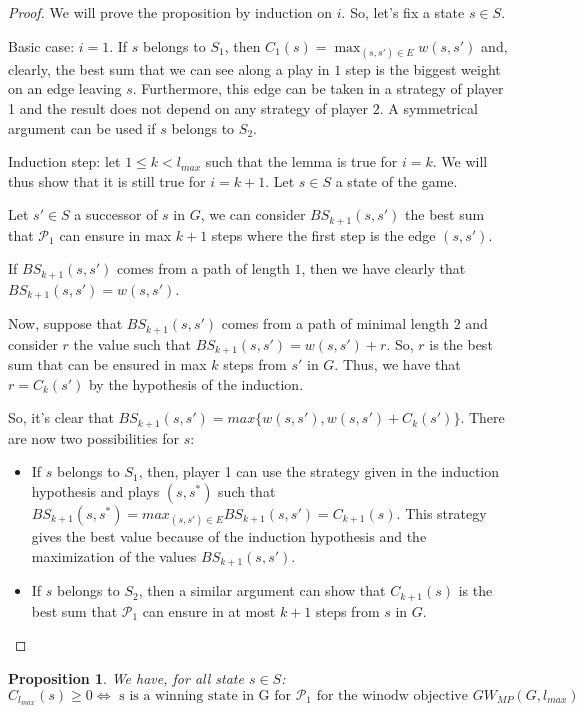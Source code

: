 \documentclass{article}
\theoremstyle{plain}
\newtheorem{prop}[thm]{Proposition}
\begin{document}
\begin{proof}
We will prove the proposition by induction on $i$. So, let's fix a state $s \in S$.

Basic case: $i = 1$. If $s$ belongs to $S_1$, then $C_1(s) = \max_{(s, s') \in E} w(s, s')$ and, clearly, the best sum that we can see along a play in $1$ step is the biggest weight on an edge leaving $s$. Furthermore, this edge can be taken in a strategy of player 1 and the result does not depend on any strategy of player $2$. A symmetrical argument can be used if $s$ belongs to $S_2$.

Induction step: let $1 \leqslant k < l_{max}$ such that the lemma is true for $i = k$. We will thus show that it is still true for $i = k+1$. Let $s \in S$ a state of the game.

Let $s' \in S$ a successor of $s$ in $G$, we can consider $BS_{k+1}(s, s')$ the best sum that $\mathcal{P}_1$ can ensure in max $k+1$ steps where the first step is the edge $(s, s')$.

If $BS_{k+1}(s, s')$ comes from a path of length $1$, then we have clearly that $BS_{k+1}(s, s')= w(s, s')$.

Now, suppose that $BS_{k+1}(s, s')$ comes from a path of minimal length $2$ and consider $r$ the value such that $BS_{k+1}(s, s') = w(s, s') + r$. So, $r$ is the best sum that can be ensured in max $k$ steps from $s'$ in $G$. Thus, we have that $r = C_k(s')$ by the hypothesis of the induction.

So, it's clear that $BS_{k+1}(s, s') = max\{w(s, s'), w(s, s')+C_k(s')\}$.
There are now two possibilities for $s$:
\begin{itemize}
\item If $s$ belongs to $S_1$, then, player 1 can use the strategy given in the induction hypothesis and plays $(s, s^*)$ such that $BS_{k+1}(s, s^*) = max_{(s, s') \in E} BS_{k+1}(s, s') = C_{k+1}(s)$. This strategy gives the best value because of the induction hypothesis and the maximization of the values $BS_{k+1}(s, s')$.

\item If $s$ belongs to $S_2$, then a similar argument can show that $C_{k+1}(s)$ is the best sum that $\mathcal{P}_1$ can ensure in at most $k+1$ steps from $s$ in $G$.
\end{itemize}
\end{proof}

\begin{prop}
We have, for all state $s \in S$:
\[C_{l_{max}}(s) \geqslant 0 \Leftrightarrow \text{ s is a winning state in G for $\mathcal{P}_1$ for the winodw objective } GW_{MP}(G, l_{max})\]
\end{prop}
\end{document}

